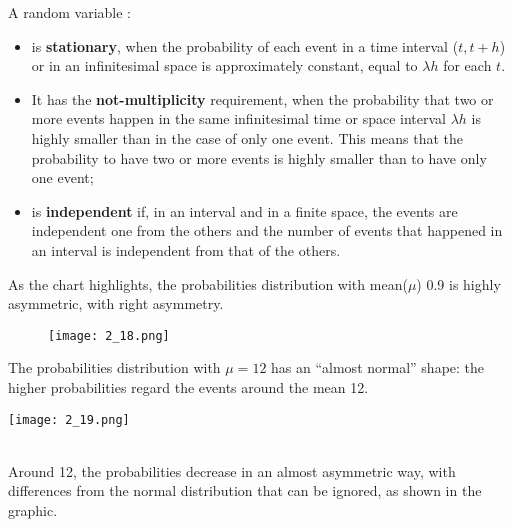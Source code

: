 \begin{frame}
  \vspace*{.25cm}
  A random variable :
  \begin{itemize}
    \item is \textbf{stationary}, when the probability of each event in a time interval ({\boldmath $ t, t + h $}) or in an infinitesimal space is approximately constant, equal to {\boldmath $ \lambda h $} for each $ t $.
    \item It has the \textbf{not-multiplicity} requirement, when the probability that two or more events happen in the same infinitesimal time or space interval $ \lambda h $ is highly smaller than in the case of only one event. This means that the probability to have two or more events is highly smaller than to have only one event;
    \item is \textbf{independent} if, in an interval and in a finite space, the events are independent one from the others and the number of events that happened in an interval is independent from that of the others.
  \end{itemize}
\end{frame}

\begin{frame}
  \vspace*{.25cm}
  As the chart highlights, the probabilities distribution with mean($ \mu $) 0.9 is highly asymmetric, with right asymmetry. \\
  \vspace*{.5cm}
  \begin{figure}
    \texttt{[image: 2\_18.png]}
  \end{figure}
\end{frame}

\begin{frame}
  \vspace*{.25cm}
  The probabilities distribution with $ \mu = 12 $ has an ``almost normal'' shape: the higher probabilities regard the events around the mean 12. \\
  \vspace*{.25cm}
  \begin{floatingfigure}[l]{6.5cm}
    \texttt{[image: 2\_19.png]} 
  \end{floatingfigure}
  \hspace*{.25cm}\\
  Around 12, the probabilities decrease in an almost asymmetric way, with differences from the normal distribution that can be ignored, as shown in the graphic.
\end{frame}

